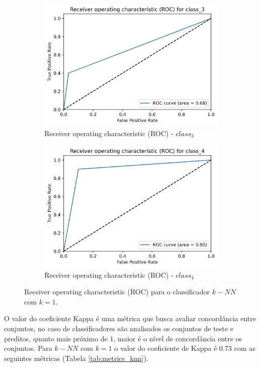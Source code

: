 \documentclass[
	article,			%
	11pt,				%
	oneside,			%
	a4paper,			%
	english,			%
	brazil,				%
	sumario=tradicional
	]{abntex2}
\begin{document}
\begin{figure}[H]
\begin{subfigure}[b]{0.475\textwidth}
    \includegraphics[scale=0.375]{fig/knn_roc3.png}
    \caption{Receiver operating characteristic (ROC) - $class_3$}
    \label{fig:knn_roc3}
    \end{subfigure}
    \hfill
    \begin{subfigure}[b]{0.475\textwidth}
    \centering
    \includegraphics[scale=0.375]{fig/knn_roc4.png}
    \caption{Receiver operating characteristic (ROC) - $class_4$}
    \label{fig:knn_roc4}
    \end{subfigure}
    \caption{Receiver operating characteristic (ROC) para o classificador $k-NN$ com $k=1$.}
    \label{knn_roc}
\end{figure}

O valor do coeficiente Kappa \cite{kappa} é uma métrica que busca avaliar concordância entre conjuntos, no caso de classificadores são analisados os conjuntos de teste e preditos, quanto mais próximo de $1$, maior é o nível de concordância entre os conjuntos. Para $k-NN$ com $k=1$ o valor do coeficiente de Kappa é $0.73$ com as seguintes métricas (Tabela \ref{tab:metrics_knn}).
\end{document}
